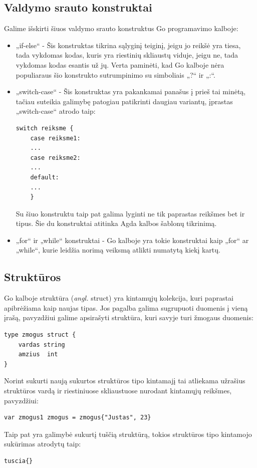 \documentclass{VUMIFPSkursinis}
\begin{document}
\subsection{Valdymo srauto konstruktai}
Galime išskirti šiuos valdymo srauto konstruktus Go programavimo kalboje:
\begin{itemize}
	\item „if-else“ - Šis konstruktas tikrina sąlyginį teiginį, jeigu jo reikšė yra tiesa, tada vykdomas kodas, kuris yra riestinių skliaustų viduje, jeigu ne, tada vykdomas kodas esantis už jų. Verta paminėti, kad Go kalboje nėra populiaraus šio konstrukto sutrumpinimo su simboliais „?“ ir „:“.
	\item {„switch-case“ - Šis konstruktas yra pakankamai panašus į prieš tai minėtą, tačiau suteikia galimybę patogiau patikrinti daugiau variantų, įprastas „switch-case“ atrodo taip:
	\begin{lstlisting}[language=GoCust]
switch reiksme {
	case reiksme1:
	...
	case reiksme2:
	...
	default:
	...
	}
	\end{lstlisting}
	Su šiuo konstruktu taip pat galima lyginti ne tik paprastas reikšmes bet ir tipus. Šie du konstruktai atitinka Agda kalbos šablonų tikrinimą.
	}
	\item „for“ ir „while“ konstruktai - Go kalboje yra tokie konstruktai kaip „for“ ar „while“, kurie leidžia norimą veiksmą atlikti numatytą kiekį kartų.
\end{itemize}
\subsection{Struktūros}
Go kalboje struktūra (\textit{angl.} struct) yra kintamųjų kolekcija, kuri paprastai apibrėžiama kaip naujas tipas. Jos pagalba galima sugrupuoti duomenis į vieną įrašą, pavyzdžiui galime apsirašyti struktūra, kuri savyje turi žmogaus duomenis:
\begin{lstlisting}[language=GoCust]
type zmogus struct {
	vardas string
	amzius  int
}
\end{lstlisting}
Norint sukurti naują sukurtos struktūros tipo kintamajį tai atliekama užrašius struktūros vardą ir riestiniuose skliaustuose nurodant kintamųjų reikšmes, pavyzdžiui: 
\begin{lstlisting}[language=GoCust]
var zmogus1 zmogus = zmogus{"Justas", 23}
\end{lstlisting}
Taip pat yra galimybė sukurtį tuščią struktūrą, tokios struktūros tipo kintamojo sukūrimas atrodytų taip: 
\begin{lstlisting}
tuscia{}
\end{lstlisting}
\end{document}
